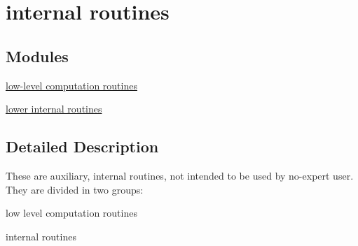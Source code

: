 \hypertarget{group__matmap__group2}{\section{internal routines}
\label{group__matmap__group2}
}
\subsection*{Modules}
\begin{DoxyCompactItemize}
\item 
\hyperlink{group__matmap__group21}{low-\/level computation routines}
\item 
\hyperlink{group__matmap__group22}{lower internal routines}
\end{DoxyCompactItemize}


\subsection{Detailed Description}
These are auxiliary, internal routines, not intended to be used by no-\/expert user. They are divided in two groups\-:
\begin{DoxyItemize}
\item low level computation routines
\item internal routines 
\end{DoxyItemize}